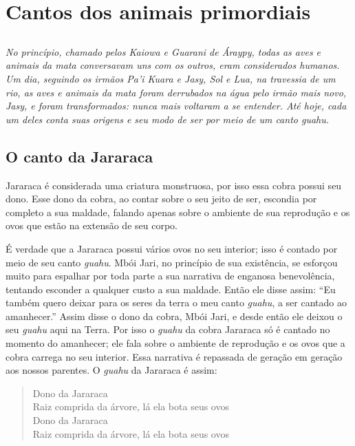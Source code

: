 \part{Cantos dos animais primordiais}%

\chapter*{}
\thispagestyle{empty}
\vspace*{\fill}
\textit{No princípio, chamado pelos Kaiowa e Guarani de \emph{Áraypy}, todas as
aves e animais da mata conversavam uns com os outros, eram considerados
humanos. Um dia, seguindo os irmãos Pa'i Kuara e Jasy, Sol e Lua, na
travessia de um rio, as aves e animais da mata foram derrubados na água
pelo irmão mais novo, Jasy, e foram transformados: nunca mais voltaram a
se entender. Até hoje, cada um deles conta suas origens e seu modo de
ser por meio de um canto \emph{guahu}.}
\vspace*{\fill}

\chapter{O canto da Jararaca}

 Jararaca é considerada uma criatura monstruosa, por isso essa cobra
possui seu dono. Esse dono da cobra, ao contar sobre o seu jeito de ser,
escondia por completo a sua maldade, falando apenas sobre o ambiente de
sua reprodução e os ovos que estão na extensão de seu corpo.

É verdade que a Jararaca possui vários ovos no seu interior; isso é
contado por meio de seu canto \textit{guahu}. Mbói Jari, no princípio de
sua existência, se esforçou muito para espalhar por toda parte a sua
narrativa de enganosa benevolência, tentando esconder a qualquer custo a
sua maldade. Então ele disse assim: ``Eu também quero deixar para os
seres da terra o meu canto \textit{guahu}, a ser cantado ao amanhecer.''
Assim disse o dono da cobra, Mbói Jari, e desde então ele deixou o seu
\textit{guahu} aqui na Terra. Por isso o \textit{guahu} da cobra Jararaca só
é cantado no momento do amanhecer; ele fala sobre o ambiente de
reprodução e os ovos que a cobra carrega no seu interior. Essa narrativa
é repassada de geração em geração aos nossos parentes. O \textit{guahu} da
Jararaca é assim:

\begin{verse}
Dono da Jararaca\\
Raiz comprida da árvore,\footnotemark{} lá ela bota seus ovos\\
Dono da Jararaca\\
Raiz comprida da árvore, lá ela bota seus ovos
\end{verse}

